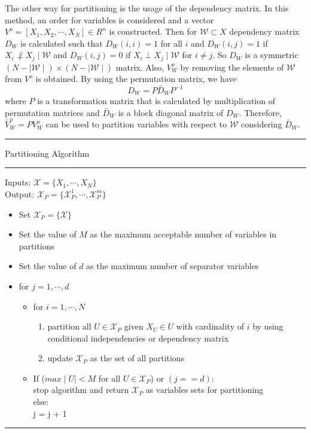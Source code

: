 \documentclass{article}
\newcommand{\X}{\mathcal{X}}
\newcommand{\W}{\mathcal{W}}
\begin{document}
The other way for partitioning is the usage of the dependency matrix. In this method, an order for variables is considered and a vector $V^o = [X_1, X_2, \cdots, X_N] \in R^n$ is constructed. Then for $\W \subset X$ dependency matrix $D_W$ is calculated such that $D_W(i,i) = 1$ for all $i$ and $D_W(i,j) = 1$ if $X_i\not \perp X_j \mid \W$ and $D_W(i,j) = 0$ if $X_i\perp X_j \mid \W$ for $i\not = j$. So $D_W$ is a symmetric $(N-\mid \W \mid) \times (N-\mid \W \mid)$ matrix. Also, $V^o_W$ by removing the elements of $\W$ from $V^o$ is obtained. By using the permutation matrix, we have
$$D_W = P\bar D_W P^{-1} $$
where $P$ is a transformation matrix that is calculated by multiplication of permutation matrices and $\bar D_W$ is a block diagonal matrix of $D_W$. Therefore, $\bar V^o_W = P V^o_W$ can be used to partition variables with respect to $\W$ considering $\bar D_W$.
\par\noindent\rule{\textwidth}{0.5pt}
\vspace{-0.4cm}
Partitioning Algorithm
\vspace{0.2cm}
\par\noindent\rule{\textwidth}{0.5pt}
Inputs: $\X =\{X_1,\cdots, X_N\}$\\
Output: $\X_P = \{\X_P^1,\cdots, \X_P^m \}$
\begin{itemize}
\item Set $\X_P = \{\X\}$
    \item Set the value of $M$ as the maximum acceptable number of variables in partitions
    \item Set the value of $d$ as the maximum number of separator variables 
    \item for $j = 1, \cdots , d$
    \begin{itemize}
        \item for $i = 1,\cdots, N$
            \begin{enumerate}         
                \item partition all $U\in \X_P$ given $X_U \in U$ with cardinality of $i$ by using conditional independencies or dependency matrix
                \item update $\X_P$ as the set of all partitions
            \end{enumerate}
        \item If ($max \mid U \mid < M$ for all $U\in \X_P$) or $(j == d)$:\\
        stop algorithm and return $\X_P$ as variables sets for partitioning\\
        else:\\
        j = j + 1
        
    \end{itemize}
\end{itemize}
\vspace{-0.4cm}
\par\noindent\rule{\textwidth}{0.5pt}
\end{document}
